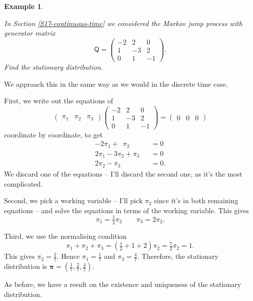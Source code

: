 \documentclass[
  a4paper,
]{article}
\theoremstyle{definition}
\theoremstyle{definition}
\newtheorem{example}{Example}[section]
\theoremstyle{definition}
\theoremstyle{remark}
\begin{document}
\begin{example}
\protect\hypertarget{exm:stat-cont-ex}{}\label{exm:stat-cont-ex}

\emph{In Section \ref{S17-continuous-time} we considered the Markov jump process with generator matrix}
\[ \mathsf Q = \begin{pmatrix} -2 & 2 & 0 \\
 1 & -3 & 2 \\
 0 & 1 & -1 \end{pmatrix} . \]
\emph{Find the stationary distribution.}

We approach this in the same way as we would in the discrete time case.

First, we write out the equations of
\[ \begin{pmatrix} \pi_1 & \pi_2 & \pi_3 \end{pmatrix}\begin{pmatrix} -2 & 2 & 0 \\
 1 & -3 & 2 \\
 0 & 1 & -1 \end{pmatrix} = \begin{pmatrix} 0 & 0 & 0 \end{pmatrix}    \]
coordinate by coordinate, to get
\begin{align*}
    -2\pi_1 + \phantom{2}\pi_2 \phantom{{}+\pi_3} &= 0 \\
    2\pi_1 - 3\pi_2 + \pi_3 &= 0 \\
    2\pi_2 - \pi_3 &= 0 .
\end{align*}
We discard one of the equations -- I'll discard the second one, as it's the most complicated.

Second, we pick a working variable -- I'll pick \(\pi_2\) since it's in both remaining equations -- and solve the equations in terms of the working variable. This gives
\[ \pi_1 = \tfrac12 \pi_2 \qquad \pi_3 = 2 \pi_2 . \]

Third, we use the normalising condition
\[ \pi_1 + \pi_2 + \pi_3 = \left(\tfrac12 + 1 + 2\right)\pi_2 = \tfrac72 \pi_2 = 1 . \]
This gives \(\pi_2 = \frac27\). Hence \(\pi_1 = \frac17\) and \(\pi_3 = \frac47\). Therefore, the stationary distribution is \(\boldsymbol\pi = (\frac17, \frac27, \frac47)\).

\end{example}

As before, we have a result on the existence and uniqueness of the stationary distribution.
\end{document}
